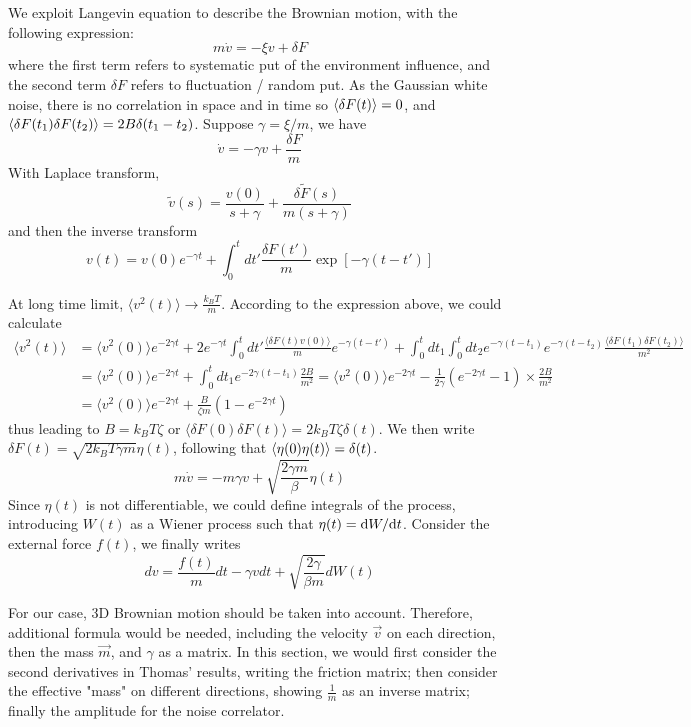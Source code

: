 \documentclass[books,12pt]{elegantpaper}
\begin{document}
We exploit Langevin equation to describe the Brownian motion, with the following expression:
$$ m\dot{v} = - \xi v + \delta F $$
where the first term refers to systematic put of the environment influence, and the second term $\delta F$ refers to fluctuation / random put. As the Gaussian white noise, there is no correlation in space and in time so $\left\langle \delta F(t) \right\rangle = 0$, and $\left\langle \delta F(t_1) \delta F(t_2) \right\rangle = 2B \delta(t_1 - t_2)$. Suppose $\gamma = \xi /m$, we have
$$ \dot{v} = -\gamma v + \frac{\delta F}{m} $$
With Laplace transform, 
$$ \tilde{v}(s) = \frac{v(0)}{s+\gamma} + \frac{\delta \tilde{F}(s)}{m(s+\gamma)} $$
and then the inverse transform
$$ v(t) = v(0) e^{-\gamma t} + \int_0^t dt' \frac{\delta F(t')}{m} \exp\left[-\gamma(t-t')\right] $$

At long time limit, $\langle v^2 (t) \rangle \to \frac{k_B T}{m}$. According to the expression above, we could calculate 
$$ \begin{align}
\langle v^2(t) \rangle &= \langle v^2(0) \rangle e^{-2\gamma t} + 2 e^{-\gamma t} \int_0^t dt' \frac{\langle \delta F(t) v(0) \rangle}{m} e^{-\gamma (t-t')} + \int_0^t dt_1 \int_0^t dt_2 e^{-\gamma (t-t_1)} e^{-\gamma (t-t_2)} \frac{\langle \delta F(t_1) \delta F(t_2) \rangle}{m^2} \\ %
&= \langle v^2(0) \rangle e^{-2\gamma t} + \int_0^t dt_1 e^{-2\gamma (t-t_1)} \frac{2B}{m^2} = \langle v^2(0) \rangle e^{-2\gamma t} - \frac{1}{2\gamma} (e^{-2\gamma t} - 1) \times \frac{2B}{m^2} \\ %
&= \langle v^2(0) \rangle e^{-2\gamma t} + \frac{B}{\zeta m} (1 - e^{-2\gamma t}) %
\end{align} $$
thus leading to $ B = k_B T \zeta $ or $\langle \delta F(0) \delta F(t) \rangle = 2k_B T \zeta \delta(t)$. We then write $\delta F(t) = \sqrt{2 k_B T \gamma m} \eta(t)$, following that $\left\langle \eta(0) \eta(t) \right\rangle = \delta(t)$. 
$$ m\dot{v} = -m \gamma v + \sqrt{\frac{2\gamma m}{\beta}} \eta(t) $$
Since $\eta(t)$ is not differentiable, we could define integrals of the process, introducing $W(t)$ as a Wiener process such that $\eta(t) = \mathrm{d}W/\mathrm{d}t$.
Consider the external force $f(t)$, we finally writes
$$ dv = \frac{f(t)}{m} dt - \gamma v dt + \sqrt{\frac{2\gamma}{\beta m}} dW(t) $$

For our case, 3D Brownian motion should be taken into account. Therefore, additional formula would be needed, including the velocity $\vec{v}$ on each direction, then the mass $\vec{m}$, and $\gamma$ as a matrix.
In this section, we would first consider the second derivatives in Thomas' results, writing the friction matrix; then consider the effective "mass" on different directions, showing $\frac{1}{m}$ as an inverse matrix; finally the amplitude for the noise correlator. %
\end{document}
